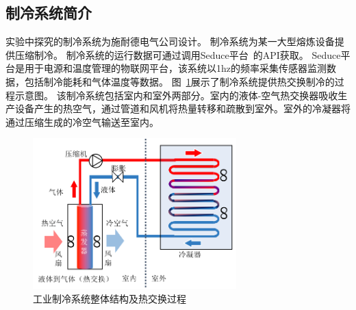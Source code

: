 \subsection{制冷系统简介}
实验中探究的制冷系统为施耐德电气公司设计。
制冷系统为某一大型熔炼设备提供压缩制冷。
制冷系统的运行数据可通过调用Seduce平台~\cite{SeducePastor2018}的API获取。
Seduce平台是用于电源和温度管理的物联网平台，该系统以1hz的频率采集传感器监测数据，包括制冷能耗和气体温度等数据。
图~\ref{fig:inrow_3dArchitecture}展示了制冷系统提供热交换制冷的过程示意图。
该制冷系统包括室内和室外两部分。室内的液体-空气热交换器吸收生产设备产生的热空气，通过管道和风机将热量转移和疏散到室外。室外的冷凝器将通过压缩生成的冷空气输送至室内。
\begin{figure}[!htbp]
    \centering
    \includegraphics[width=0.7\textwidth]{figures/chapter4/inrow_architecture.pdf}
    \caption{工业制冷系统整体结构及热交换过程}
  \label{fig:inrow_3dArchitecture} 
\end{figure}

